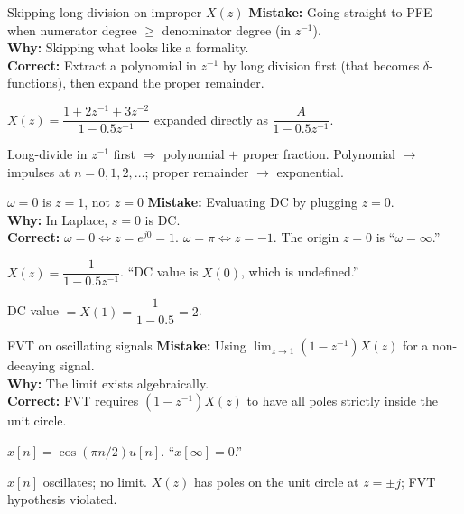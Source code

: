 \documentclass[11pt]{article}
\begin{document}
\begin{pitfallbox}{Skipping long division on improper $X(z)$}
\textbf{Mistake:} Going straight to PFE when numerator degree $\ge$ denominator degree (in $z^{-1}$).\\
\textbf{Why:} Skipping what looks like a formality.\\
\textbf{Correct:} Extract a polynomial in $z^{-1}$ by long division first (that becomes $\delta$-functions), then expand the proper remainder.
\begin{wrongbox}
$X(z) = \dfrac{1 + 2z^{-1} + 3z^{-2}}{1-0.5z^{-1}}$ expanded directly as $\dfrac{A}{1-0.5z^{-1}}$.
\end{wrongbox}
\begin{rightbox}
Long-divide in $z^{-1}$ first $\Rightarrow$ polynomial $+$ proper fraction. Polynomial $\to$ impulses at $n=0,1,2,\ldots$; proper remainder $\to$ exponential.
\end{rightbox}
\end{pitfallbox}

\begin{pitfallbox}{$\omega=0$ is $z=1$, not $z=0$}
\textbf{Mistake:} Evaluating DC by plugging $z=0$.\\
\textbf{Why:} In Laplace, $s=0$ is DC.\\
\textbf{Correct:} $\omega=0 \Leftrightarrow z=e^{j0}=1$. $\omega=\pi \Leftrightarrow z=-1$. The origin $z=0$ is ``$\omega=\infty$.''
\begin{wrongbox}
$X(z) = \dfrac{1}{1-0.5z^{-1}}$. ``DC value is $X(0)$, which is undefined.''
\end{wrongbox}
\begin{rightbox}
DC value $= X(1) = \dfrac{1}{1-0.5} = 2$.
\end{rightbox}
\end{pitfallbox}

\begin{pitfallbox}{FVT on oscillating signals}
\textbf{Mistake:} Using $\lim_{z\to 1}(1-z^{-1}) X(z)$ for a non-decaying signal.\\
\textbf{Why:} The limit exists algebraically.\\
\textbf{Correct:} FVT requires $(1-z^{-1}) X(z)$ to have all poles strictly inside the unit circle.
\begin{wrongbox}
$x[n] = \cos(\pi n/2) u[n]$. ``$x[\infty] = 0$.''
\end{wrongbox}
\begin{rightbox}
$x[n]$ oscillates; no limit. $X(z)$ has poles on the unit circle at $z=\pm j$; FVT hypothesis violated.
\end{rightbox}
\end{pitfallbox}
\end{document}
